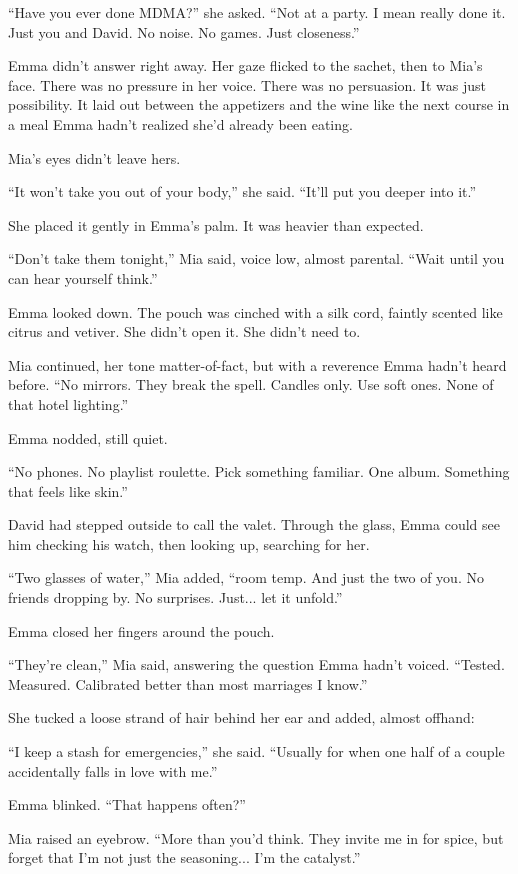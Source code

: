 ``Have you ever done MDMA?'' she asked. ``Not at a party. I mean really done it. Just you and David. No noise. 
No games. Just closeness.''

Emma didn’t answer right away. Her gaze flicked to the sachet, then to Mia’s face. There was no pressure in 
her voice. There was no persuasion. It was just possibility. It laid out between the appetizers and the wine 
like the next course in a meal Emma hadn’t realized she’d already been eating.

Mia’s eyes didn’t leave hers.

``It won’t take you out of your body,'' she said. ``It’ll put you deeper into it.''

She placed it gently in Emma’s palm. It was heavier than expected.

``Don’t take them tonight,'' Mia said, voice low, almost parental. ``Wait until
you can hear yourself think.''

Emma looked down. The pouch was cinched with a silk cord, faintly scented like
citrus and vetiver. She didn’t open it. She didn’t need to.

Mia continued, her tone matter-of-fact, but with a reverence Emma hadn’t heard
before. ``No mirrors. They break the spell. Candles only. Use soft ones. None of
that hotel lighting.''

Emma nodded, still quiet.

``No phones. No playlist roulette. Pick something familiar. One album. Something
that feels like skin.''

David had stepped outside to call the valet. Through the glass, Emma could see
him checking his watch, then looking up, searching for her.

``Two glasses of water,'' Mia added, ``room temp. And just the two of you. No
friends dropping by. No surprises. Just... let it unfold.''

Emma closed her fingers around the pouch.

``They’re clean,'' Mia said, answering the question Emma hadn’t voiced. ``Tested.
Measured. Calibrated better than most marriages I know.''

She tucked a loose strand of hair behind her ear and added, almost offhand:

``I keep a stash for emergencies,'' she said. ``Usually for when one half of a
couple accidentally falls in love with me.''

Emma blinked. ``That happens often?''

Mia raised an eyebrow. ``More than you'd think. They invite me in for spice,
but forget that I'm not just the seasoning... I'm the catalyst.''


